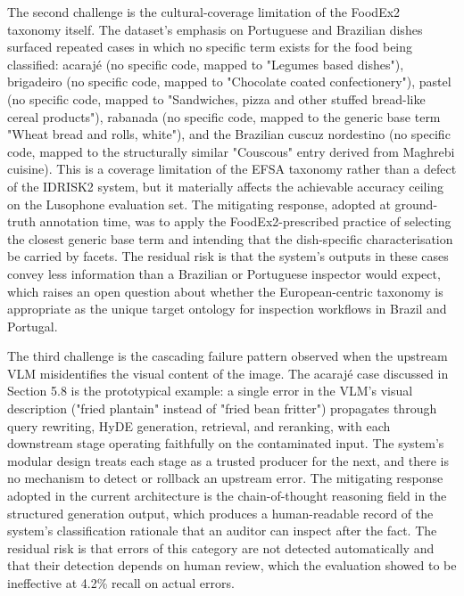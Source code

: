The second challenge is the cultural-coverage limitation of the FoodEx2 taxonomy itself. The dataset's emphasis on Portuguese and Brazilian dishes surfaced repeated cases in which no specific term exists for the food being classified: acarajé (no specific code, mapped to "Legumes based dishes"), brigadeiro (no specific code, mapped to "Chocolate coated confectionery"), pastel (no specific code, mapped to "Sandwiches, pizza and other stuffed bread-like cereal products"), rabanada (no specific code, mapped to the generic base term "Wheat bread and rolls, white"), and the Brazilian cuscuz nordestino (no specific code, mapped to the structurally similar "Couscous" entry derived from Maghrebi cuisine). This is a coverage limitation of the EFSA taxonomy rather than a defect of the IDRISK2 system, but it materially affects the achievable accuracy ceiling on the Lusophone evaluation set. The mitigating response, adopted at ground-truth annotation time, was to apply the FoodEx2-prescribed practice of selecting the closest generic base term and intending that the dish-specific characterisation be carried by facets. The residual risk is that the system's outputs in these cases convey less information than a Brazilian or Portuguese inspector would expect, which raises an open question about whether the European-centric taxonomy is appropriate as the unique target ontology for inspection workflows in Brazil and Portugal.

The third challenge is the cascading failure pattern observed when the upstream VLM misidentifies the visual content of the image. The acarajé case discussed in Section 5.8 is the prototypical example: a single error in the VLM's visual description ("fried plantain" instead of "fried bean fritter") propagates through query rewriting, HyDE generation, retrieval, and reranking, with each downstream stage operating faithfully on the contaminated input. The system's modular design treats each stage as a trusted producer for the next, and there is no mechanism to detect or rollback an upstream error. The mitigating response adopted in the current architecture is the chain-of-thought reasoning field in the structured generation output, which produces a human-readable record of the system's classification rationale that an auditor can inspect after the fact. The residual risk is that errors of this category are not detected automatically and that their detection depends on human review, which the evaluation showed to be ineffective at 4.2\% recall on actual errors.


